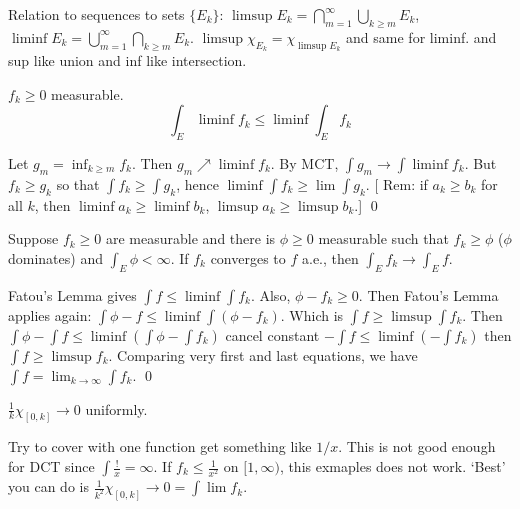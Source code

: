 \begin{rem}
Relation to sequences to sets $\{E_k\}$: $\limsup E_k= \bigcap_{m=1}^\infty \bigcup_{k \geq m} E_k$, $\liminf E_k= \bigcup_{m=1}^\infty \bigcap_{k \geq m} E_k$. $\limsup \chi_{E_k}= \chi_{\limsup E_k}$ and same for liminf. and sup like union and inf like intersection. 
\end{rem}


\begin{lem}[Fatou]
$f_k \geq 0$ measurable.
\[ \int_E \liminf f_k \leq \liminf \int_E f_k \]
\end{lem}

\pf Let $g_m= \inf_{k \geq m} f_k$. Then $g_m \nearrow \liminf f_k$. By MCT, $\int g_m \to \int \liminf f_k$. But $f_k \geq g_k$ so that $\int f_k \geq \int g_k$, hence $\liminf \int f_k \geq \lim \int g_k$. [ Rem: if $a_k \geq b_k$ for all $k$, then $\liminf a_k \geq \liminf b_k$, $\limsup a_k \geq \limsup b_k$.] \qed \\


\begin{thm}
Suppose $f_k \geq 0$ are measurable and there is $\phi \geq 0$ measurable such that $f_k \geq \phi$ ($\phi$ dominates) and $\int_E \phi< \infty$. If $f_k$ converges to $f$ a.e., then $\int_E f_k \to \int_E f$. 
\end{thm}

\pf Fatou's Lemma gives $\int f \leq \liminf \int f_k$. Also, $\phi - f_k \geq 0$. Then Fatou's Lemma applies again: $\int \phi - f \leq \liminf \int (\phi - f_k)$. Which is $\int f \geq \limsup \int f_k$. Then $\int \phi - \int f \leq \liminf (\int \phi - \int f_k)$ cancel constant $-\int f \leq \liminf (-\int f_k)$ then $\int f \geq \limsup f_k$. Comparing very first and last equations, we have $\int f= \lim_{k \to \infty} \int f_k$. \qed \\





\begin{ex}
$\frac{1}{k} \chi_{[0,k]} \to 0$ uniformly. 


Try to cover with one function get something like $1/x$. This is not good enough for DCT since $\int \frac{!}{x}= \infty$. If $f_k \leq \frac{1}{x^2}$ on $[1,\infty)$, this exmaples does not work. `Best' you can do is $\frac{1}{k^2} \chi_{[0,k]} \to 0= \int \lim f_k$. 
\end{ex}


